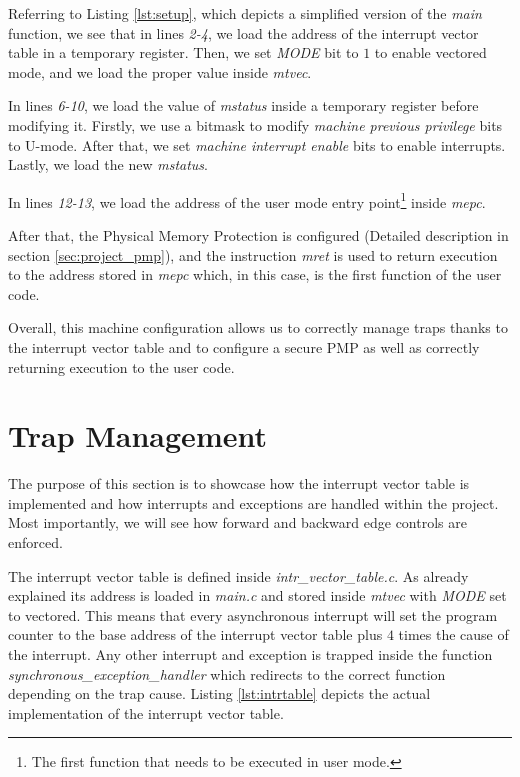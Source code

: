 Referring to Listing \ref{lst:setup}, which depicts a simplified version of the
\textit{main} function, we see that in lines \textit{2-4}, we load the address
of the interrupt vector table in a temporary register. Then, we set \textit{MODE}
bit to $1$ to enable vectored mode, and we load the proper value inside \textit{mtvec}.

In lines \textit{6-10}, we load the value of \textit{mstatus} inside a temporary
register before modifying it. Firstly, we use a bitmask to modify \textit{machine
previous privilege} bits to U-mode. After that, we set \textit{machine interrupt
enable} bits to enable interrupts. Lastly, we load the new \textit{mstatus}.

In lines \textit{12-13}, we load the address of the user mode entry point\footnote{The
first function that needs to be executed in user mode.} inside \textit{mepc}.

After that, the Physical Memory Protection is configured (Detailed description in
section \ref{sec:project_pmp}), and the instruction \textit{mret} is used to
return execution to the address stored in \textit{mepc} which, in this case, is the
first function of the user code.

Overall, this machine configuration allows us to correctly manage traps thanks
to the interrupt vector table and to configure a secure PMP as well as correctly
returning execution to the user code.

\section{Trap Management}
\label{sec:project_isr}

The purpose of this section is to showcase how the interrupt vector table is implemented
and how interrupts and exceptions are handled within the project. Most
importantly, we will see how forward and backward edge controls are enforced.

The interrupt vector table is defined inside \textit{intr\_vector\_table.c}. As already
explained its address is loaded in \textit{main.c} and stored inside \textit{mtvec}
with \textit{MODE} set to vectored. This means that every asynchronous interrupt
will set the program counter to the base address of the interrupt vector table plus
$4$ times the cause of the interrupt. Any other interrupt and exception is
trapped inside the function \textit{synchronous\_exception\_handler} which redirects
to the correct function depending on the trap cause. Listing \ref{lst:intrtable}
depicts the actual implementation of the interrupt vector table.

